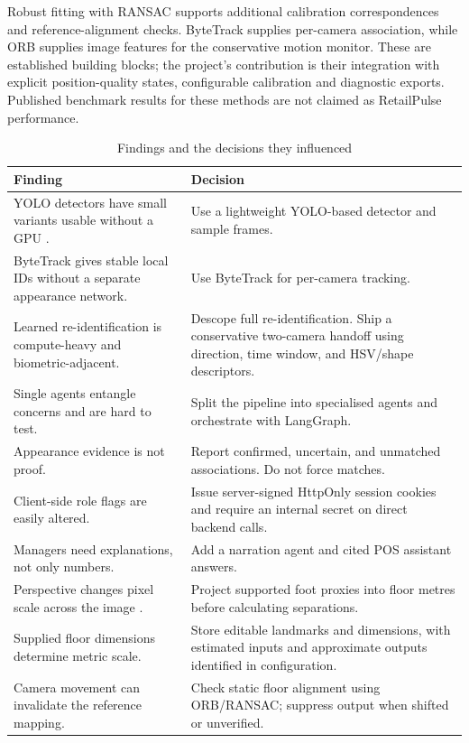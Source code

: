 Robust fitting with RANSAC \cite{fischler1981ransac} supports additional calibration correspondences and reference-alignment checks. ByteTrack \cite{zhang2022bytetrack} supplies per-camera association, while ORB \cite{rublee2011orb} supplies image features for the conservative motion monitor. These are established building blocks; the project's contribution is their integration with explicit position-quality states, configurable calibration and diagnostic exports. Published benchmark results for these methods are not claimed as RetailPulse performance.

\begin{longtable}{P{0.38\textwidth}P{0.5\textwidth}}
\caption{Findings and the decisions they influenced}\\
\toprule
Finding & Decision\\
\midrule
\endhead
YOLO detectors have small variants usable without a GPU \cite{redmon2016yolo,ultralytics}. & Use a lightweight YOLO-based detector and sample frames.\\
ByteTrack \cite{zhang2022bytetrack} gives stable local IDs without a separate appearance network. & Use ByteTrack for per-camera tracking.\\
Learned re-identification \cite{ye2022reid} is compute-heavy and biometric-adjacent. & Descope full re-identification. Ship a conservative two-camera handoff using direction, time window, and HSV/shape descriptors.\\
Single agents entangle concerns and are hard to test. & Split the pipeline into specialised agents and orchestrate with LangGraph.\\
Appearance evidence is not proof. & Report confirmed, uncertain, and unmatched associations. Do not force matches.\\
Client-side role flags are easily altered. & Issue server-signed HttpOnly session cookies and require an internal secret on direct backend calls.\\
Managers need explanations, not only numbers. & Add a narration agent and cited POS assistant answers.\\
Perspective changes pixel scale across the image \cite{hartley2004multiple,opencvHomography}. & Project supported foot proxies into floor metres before calculating separations.\\
Supplied floor dimensions determine metric scale. & Store editable landmarks and dimensions, with estimated inputs and approximate outputs identified in configuration.\\
Camera movement can invalidate the reference mapping. & Check static floor alignment using ORB/RANSAC; suppress output when shifted or unverified.\\
\bottomrule
\end{longtable}
